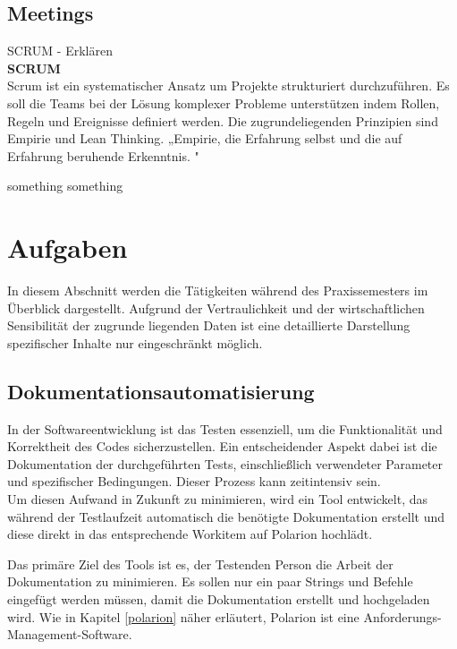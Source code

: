 \documentclass[a4paper, 12pt]{article}
\begin{document}
\subsection{Meetings}\label{Meetings}
SCRUM - Erklären
\\ 
\textbf{SCRUM}\\
Scrum ist ein systematischer Ansatz um Projekte strukturiert durchzuführen. Es soll die Teams bei der Lösung komplexer Probleme unterstützen indem Rollen, Regeln und Ereignisse definiert werden. Die zugrundeliegenden Prinzipien sind Empirie und Lean Thinking. 
„Empirie, die Erfahrung selbst und die auf Erfahrung beruhende Erkenntnis.  
 \cite{dorsch_empirie}" 

something something  %
\cite{scrum2020}

\newpage
\section{Aufgaben}\label{Aufgaben}
In diesem Abschnitt werden die Tätigkeiten während des Praxissemesters im Überblick dargestellt. Aufgrund der Vertraulichkeit und der wirtschaftlichen Sensibilität der zugrunde liegenden Daten ist eine detaillierte Darstellung spezifischer Inhalte nur eingeschränkt möglich.

\subsection{Dokumentationsautomatisierung}\label{Dokumentationsautomatisierung}
In der Softwareentwicklung ist das Testen essenziell, um die Funktionalität und Korrektheit des Codes sicherzustellen. Ein entscheidender Aspekt dabei ist die Dokumentation der durchgeführten Tests, einschließlich verwendeter Parameter und spezifischer Bedingungen. Dieser Prozess kann zeitintensiv sein. \\
Um diesen Aufwand in Zukunft zu minimieren, wird ein Tool entwickelt, das während der Testlaufzeit automatisch die benötigte Dokumentation erstellt und diese direkt in das entsprechende Workitem auf Polarion hochlädt. 

Das primäre Ziel des Tools ist es, der Testenden Person die Arbeit der Dokumentation zu minimieren. Es sollen nur ein paar Strings und Befehle eingefügt werden müssen, damit die Dokumentation erstellt und hochgeladen wird.
Wie in Kapitel \ref{polarion} näher erläutert, Polarion ist eine Anforderungs-Management-Software. 
\end{document}
